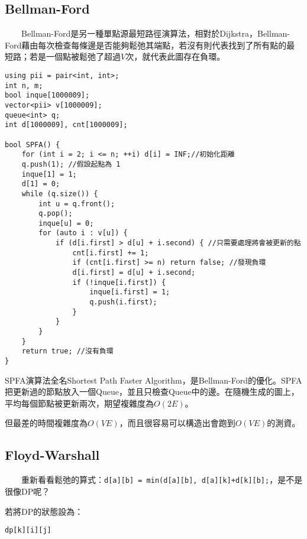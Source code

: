
\subsection{Bellman-Ford}

　　Bellman-Ford是另一種單點源最短路徑演算法，相對於Dijkstra，Bellman-Ford藉由每次檢查每條邊是否能夠鬆弛其端點，若沒有則代表找到了所有點的最短路；若是一個點被鬆弛了超過$V$次，就代表此圖存在負環。

\begin{lstlisting}[caption=SPFA演算法]
using pii = pair<int, int>;
int n, m;
bool inque[1000009];
vector<pii> v[1000009]; 
queue<int> q;
int d[1000009], cnt[1000009];

bool SPFA() {
	for (int i = 2; i <= n; ++i) d[i] = INF;//初始化距離
	q.push(1); //假設起點為 1
	inque[1] = 1;
	d[1] = 0;
	while (q.size()) {
		int u = q.front();
		q.pop();
		inque[u] = 0;
		for (auto i : v[u]) {
    		if (d[i.first] > d[u] + i.second) { //只需要處理將會被更新的點
    		    cnt[i.first] += 1;
    			if (cnt[i.first] >= n) return false; //發現負環
    			d[i.first] = d[u] + i.second;
    			if (!inque[i.first]) {
    				inque[i.first] = 1;
    				q.push(i.first);
    			}
    		}
		}
	}
	return true; //沒有負環
}
\end{lstlisting}


SPFA演算法全名Shortest Path Faster Algorithm，是Bellman-Ford的優化。SPFA把更新過的節點放入一個Queue，並且只檢查Queue中的邊。在隨機生成的圖上，平均每個節點被更新兩次，期望複雜度為$O(2E)$。

但最差的時間複雜度為$O(VE)$，而且很容易可以構造出會跑到$O(VE)$的測資。

\subsection{Floyd-Warshall}

　　重新看看鬆弛的算式：\lstinline{d[a][b] = min(d[a][b], d[a][k]+d[k][b];}，是不是很像DP呢？

\hspace*{\fill}

若將DP的狀態設為：

\begin{center}
    \lstinline{dp[k][i][j]}
\end{center}

